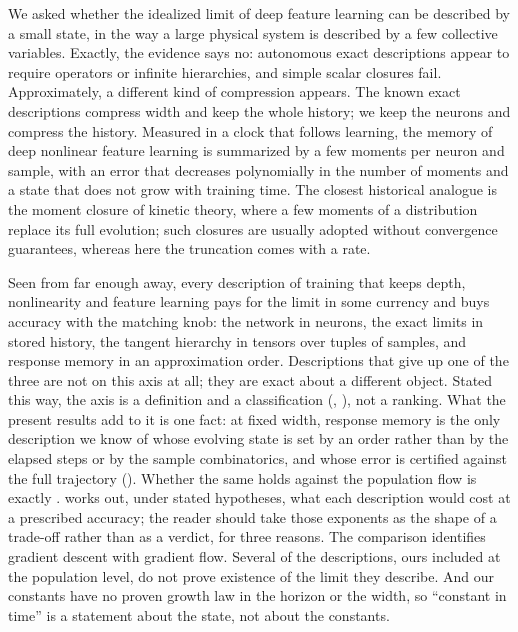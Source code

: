 \documentclass[11pt]{article}
\theoremstyle{definition}
\theoremstyle{remark}
\begin{document}
We asked whether the idealized limit of deep feature learning can be described
by a small state, in the way a large physical system is described by a few
collective variables.  Exactly, the evidence says no: autonomous exact
descriptions appear to require operators or infinite hierarchies, and simple
scalar closures fail.  Approximately, a different kind of compression appears.
The known exact descriptions compress width and keep the whole history; we keep
the neurons and compress the history.  Measured in a clock that follows learning,
the memory of deep nonlinear feature learning is summarized by a few moments per
neuron and sample, with an error that decreases polynomially in the number of
moments and a state that does not grow with training time.  The closest
historical analogue is the moment closure of kinetic theory, where a few moments
of a distribution replace its full evolution; such closures are usually adopted
without convergence guarantees, whereas here the truncation comes with a rate.

Seen from far enough away, every description of training that keeps depth,
nonlinearity and feature learning pays for the limit in some currency and buys
accuracy with the matching knob: the network in neurons, the exact limits in
stored history, the tangent hierarchy in tensors over tuples of samples, and
response memory in an approximation order.  Descriptions that give up one of
the three are not on this axis at all; they are exact about a different object.
Stated this way, the axis is a definition and a classification
(, ), not a ranking.  What the present results
add to it is one fact: at fixed width, response memory is the only description
we know of whose evolving state is set by an order rather than by the elapsed
steps or by the sample combinatorics, and whose error is certified against the
full trajectory ().  Whether the same holds against the
population flow is exactly .   works out,
under stated hypotheses, what each description would cost at a prescribed
accuracy; the reader should take those exponents as the shape of a trade-off
rather than as a verdict, for three reasons.  The comparison identifies gradient
descent with gradient flow.  Several of the descriptions, ours included at the
population level, do not prove existence of the limit they describe.  And our
constants have no proven growth law in the horizon or the width, so ``constant
in time'' is a statement about the state, not about the constants.
\end{document}
